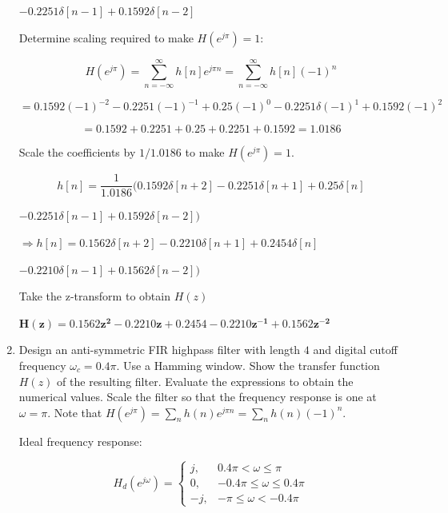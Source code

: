 \documentclass[fleqn]{article}
\begin{document}
\begin{enumerate}[nolistsep]
		$ - 0.2251\delta[n-1] +  0.1592\delta[n-2]$
		
		Determine scaling required to make $H(e^{j\pi}) = 1$:
		
		\begin{equation*}
			H(e^{j\pi}) = \sum_{n=-\infty}^{\infty}{h[n]e^{j{\pi}n}} = \sum_{n=-\infty}^{\infty}{h[n](-1)^n}
		\end{equation*}
		
		\begin{equation*}
			= 0.1592(-1)^{-2} - 0.2251(-1)^{-1} + 0.25(-1)^{0} - 0.2251\delta(-1)^{1} +  0.1592(-1)^{2}
		\end{equation*}
		
		\begin{equation*}
			= 0.1592 + 0.2251 + 0.25 + 0.2251 + 0.1592 = 1.0186
		\end{equation*}
		
		Scale the coefficients by $1/1.0186$ to make $H(e^{j\pi}) = 1$.
		
		\begin{equation*}
			h[n] = \frac{1}{1.0186}(0.1592\delta[n+2] - 0.2251\delta[n+1] + 0.25\delta[n]
		\end{equation*}
		
		$- 0.2251\delta[n-1] +  0.1592\delta[n-2])$
		
		$\Rightarrow h[n] = 0.1562\delta[n+2] - 0.2210\delta[n+1] + 0.2454\delta[n]$
		
		$- 0.2210\delta[n-1] +  0.1562\delta[n-2])$
		
		Take the z-transform to obtain $H(z)$
		
		$\mathbf{H(z) = 0.1562z^2 - 0.2210z + 0.2454 - 0.2210z^{-1} +  0.1562z^{-2}}$
		
		\pagebreak
		\item Design an anti-symmetric FIR highpass filter with length $4$ and digital cutoff frequency $\omega_c = 0.4\pi$. Use a Hamming window. Show the transfer function $H(z)$ of the resulting filter. Evaluate the expressions to obtain the numerical values. Scale the filter so that the frequency response is one at $\omega = \pi$. Note that $H(e^{j\pi}) = \sum_{n}{h(n)e^{j{\pi}n}} = \sum_{n}{h(n)(-1)^n}$.
		
		Ideal frequency response:
		
		\begin{equation*}
			H_d(e^{j\omega}) =
			\begin{cases}
				j, & 0.4\pi < \omega \leq \pi \\
				0, & -0.4\pi \leq \omega \leq 0.4\pi \\
				-j, & -\pi \leq \omega < -0.4\pi
			\end{cases}
		\end{equation*}
		

\end{enumerate}
\end{document}
